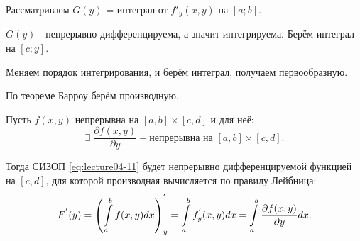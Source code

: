 \begin{col-answer-preambule}
\end{col-answer-preambule}

\begin{plan}
\item Рассматриваем $G(y)$ = интеграл от $f'_y(x, y)$ на $[a; b]$.
\item $G(y)$ - непрерывно дифференцируема, а значит интегрируема. Берём интеграл на $[c; y]$.
\item Меняем порядок интегрирования, и берём интеграл, получаем первообразную.
\item По теореме Барроу берём производную.
\end{plan}
\begin{theorem}
	Пусть $f(x,y)$ непрерывна на $[a,b] \times [c,d]$ и для неё:
	\begin{equation*}
	\exists \; \dfrac{\partial f(x,y)}{\partial y} - \text{непрерывна на $[a,b] \times [c,d]$}.
	\end{equation*}

	Тогда СИЗОП \eqref{eq:lecture04-11} будет непрерывно дифференцируемой функцией на $[c,d]$, для которой производная вычисляется по правилу Лейбница:
	\begin{equation}
	\label{eq:lecture04-14}
	F^{'}(y) = \left(\displaystyle\int\limits_a^b f(x,y) dx\right)^{'}_y = \displaystyle\int\limits_a^b f^{'}_{y}(x,y)dx = \displaystyle\int\limits_a^b \dfrac{\partial f(x,y)}{\partial y} dx.
	\end{equation}
\end{theorem}
